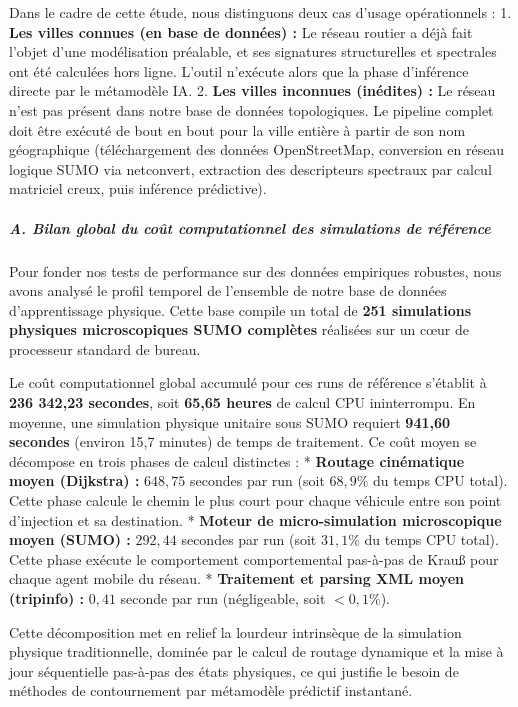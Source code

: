 \documentclass[10pt, a4paper]{article}
\begin{document}
Dans le cadre de cette étude, nous distinguons deux cas d'usage
opérationnels : 1. \textbf{Les villes connues (en base de données) :} Le
réseau routier a déjà fait l'objet d'une modélisation préalable, et ses
signatures structurelles et spectrales ont été calculées hors ligne.
L'outil n'exécute alors que la phase d'inférence directe par le
métamodèle IA. 2. \textbf{Les villes inconnues (inédites) :} Le réseau
n'est pas présent dans notre base de données topologiques. Le pipeline
complet doit être exécuté de bout en bout pour la ville entière à partir
de son nom géographique (téléchargement des données OpenStreetMap,
conversion en réseau logique SUMO via netconvert, extraction des
descripteurs spectraux par calcul matriciel creux, puis inférence
prédictive).

\subparagraph{A. Bilan global du coût computationnel des simulations de
référence}\label{a.-bilan-global-du-couxfbt-computationnel-des-simulations-de-ruxe9fuxe9rence}

Pour fonder nos tests de performance sur des données empiriques
robustes, nous avons analysé le profil temporel de l'ensemble de notre
base de données d'apprentissage physique. Cette base compile un total de
\textbf{251 simulations physiques microscopiques SUMO complètes}
réalisées sur un cœur de processeur standard de bureau.

Le coût computationnel global accumulé pour ces runs de référence
s'établit à \textbf{236 342,23 secondes}, soit \textbf{65,65 heures} de
calcul CPU ininterrompu. En moyenne, une simulation physique unitaire
sous SUMO requiert \textbf{941,60 secondes} (environ 15,7 minutes) de
temps de traitement. Ce coût moyen se décompose en trois phases de
calcul distinctes : * \textbf{Routage cinématique moyen (Dijkstra) :}
\(648,75\) secondes par run (soit \(68,9\%\) du temps CPU total). Cette
phase calcule le chemin le plus court pour chaque véhicule entre son
point d'injection et sa destination. * \textbf{Moteur de
micro-simulation microscopique moyen (SUMO) :} \(292,44\) secondes par
run (soit \(31,1\%\) du temps CPU total). Cette phase exécute le
comportement comportemental pas-à-pas de Krauß pour chaque agent mobile
du réseau. * \textbf{Traitement et parsing XML moyen (tripinfo) :}
\(0,41\) seconde par run (négligeable, soit \(<0,1\%\)).

Cette décomposition met en relief la lourdeur intrinsèque de la
simulation physique traditionnelle, dominée par le calcul de routage
dynamique et la mise à jour séquentielle pas-à-pas des états physiques,
ce qui justifie le besoin de méthodes de contournement par métamodèle
prédictif instantané.
\end{document}
